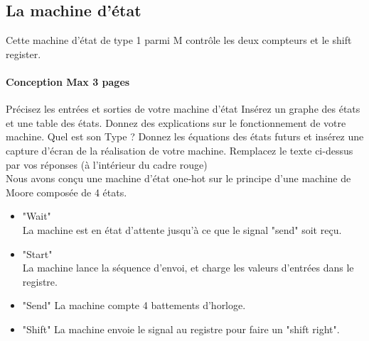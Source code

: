 \documentclass[a4paper]{article} %
\begin{document}
\subsection{La machine d’état}
Cette machine d’état de type 1 parmi M contrôle les deux compteurs et le shift register. 
\begin{tcolorbox}[colframe=Monokaimagenta,colback=white, breakable, enhanced]
\paragraph{Conception Max 3 pages}
Précisez les entrées et sorties de votre machine d’état
Insérez un graphe des états et une table des états. Donnez des explications sur le fonctionnement de votre machine. Quel est son Type ?
Donnez les équations des états futurs et insérez une capture d’écran de la réalisation de votre machine.
Remplacez le texte ci-dessus par vos réponses (à l’intérieur du cadre rouge)
\\

Nous avons conçu une machine d'état one-hot sur le principe d'une machine de Moore composée de 4 états. 
\begin{itemize}
	\item "Wait"\\
	La machine est en état d'attente jusqu'à ce que le signal "send" soit reçu.
	\item "Start"\\
	La machine lance la séquence d'envoi, et charge les valeurs d'entrées dans le registre.
	\item "Send"
	La machine compte 4 battements d'horloge.
	\item "Shift"
	La machine envoie le signal au registre pour faire un "shift right".
\end{itemize}

\begin{center}

\end{center}
\end{tcolorbox}
\end{document}
